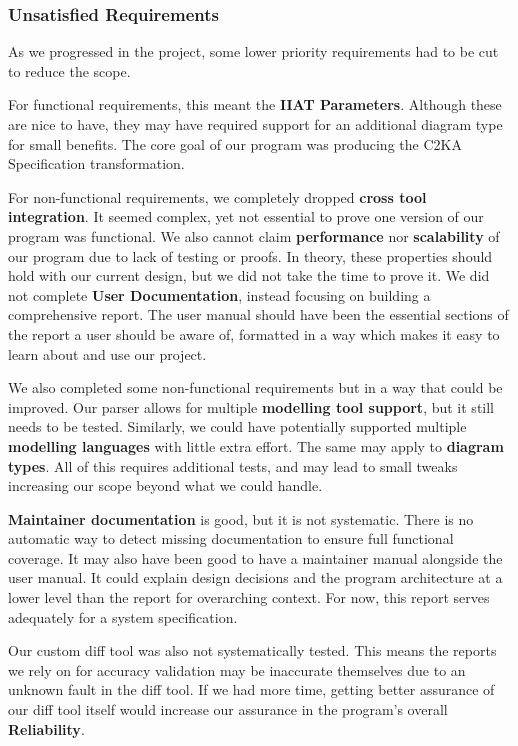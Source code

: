 \documentclass[11pt]{article}
\begin{document}
    \newpage
    \subsubsection{Unsatisfied Requirements} \label{subsubsec:unsat-reqs}
    As we progressed in the project, some lower priority requirements had to be cut to reduce the scope.

    For functional requirements, this meant the \textbf{IIAT Parameters}.
    Although these are nice to have, they may have required support for an additional diagram type for small benefits.
    The core goal of our program was producing the C2KA Specification transformation.

    For non-functional requirements, we completely dropped \textbf{cross tool integration}.
    It seemed complex, yet not essential to prove one version of our program was functional.
    We also cannot claim \textbf{performance} nor \textbf{scalability} of our program due to lack of testing or proofs.
    In theory, these properties should hold with our current design, but we did not take the time to prove it.
    We did not complete \textbf{User Documentation}, instead focusing on building a comprehensive report.
    The user manual should have been the essential sections of the report a user should be aware of,
    formatted in a way which makes it easy to learn about and use our project.

    We also completed some non-functional requirements but in a way that could be improved.
    Our parser allows for multiple \textbf{modelling tool support}, but it still needs to be tested.
    Similarly, we could have potentially supported multiple \textbf{modelling languages} with little extra effort.
    The same may apply to \textbf{diagram types}.
    All of this requires additional tests, and may lead to small tweaks increasing our scope beyond what we could handle.

    \textbf{Maintainer documentation} is good, but it is not systematic.
    There is no automatic way to detect missing documentation to ensure full functional coverage.
    It may also have been good to have a maintainer manual alongside the user manual.
    It could explain design decisions and the program architecture at a lower level than the report for overarching context.
    For now, this report serves adequately for a system specification.

    Our custom diff tool was also not systematically tested.
    This means the reports we rely on for accuracy validation may be inaccurate themselves due to an unknown fault in the diff tool.
    If we had more time, getting better assurance of our diff tool itself would increase our assurance in the program's overall
    \textbf{Reliability}.
\end{document}
